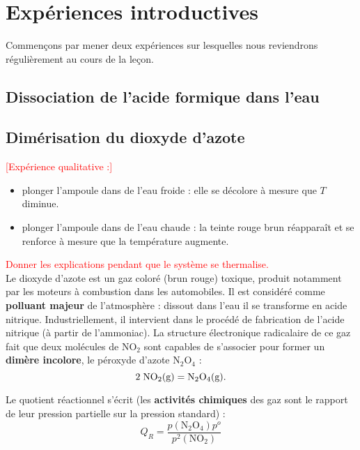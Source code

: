\documentclass[11pt,a4paper]{report}
\begin{document}
\newpage
\section{Expériences introductives}

Commençons par mener deux expériences sur lesquelles nous reviendrons régulièrement au cours de la leçon.

\subsection{Dissociation de l'acide formique dans l'eau}

\newpage
\subsection{Dimérisation du dioxyde d'azote}

\textcolor{red}{[Expérience qualitative :]} 	
 	\begin{itemize}
 		\item plonger l'ampoule dans de l'eau froide : elle se décolore à mesure que $T$ diminue.
 		\item plonger l'ampoule dans de l'eau chaude : la teinte rouge brun réapparaît et se renforce à mesure que la température augmente.
 	\end{itemize}
\textcolor{red}{Donner les explications pendant que le système se thermalise.}\\
 	
Le dioxyde d'azote est un gaz coloré (brun rouge) toxique, produit notamment par les moteurs à combustion dans les automobiles. Il est considéré comme \textbf{polluant majeur} de l'atmosphère : dissout dans l'eau il se transforme en acide nitrique. Industriellement, il intervient dans le procédé de fabrication de l'acide nitrique (à partir de l'ammoniac). La structure électronique radicalaire de ce gaz fait que deux molécules de $\text{NO}_2$ sont capables de s'associer pour former un \textbf{dimère incolore}, le péroxyde d'azote $\text{N}_2\text{O}_4$ :
\begin{equation}
	 2\;\text{NO}_2\text{(g)} = \text{N}_2\text{O}_4\text{(g)}.\\
\end{equation}

Le quotient réactionnel s'écrit (les \textbf{activités chimiques} des gaz sont le rapport de leur pression partielle sur la pression standard) :
\begin{equation}
	Q_R = \frac{p(\text{N}_2\text{O}_4)p^o}{p^2(\text{NO}_2)}
\end{equation}
\end{document}
